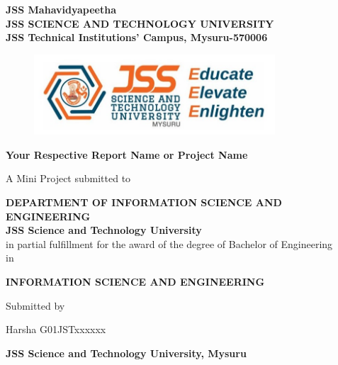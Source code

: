 \thispagestyle{empty} 
\begin{center}
    { \large {\bfseries {JSS Mahavidyapeetha \\
    JSS SCIENCE AND TECHNOLOGY UNIVERSITY \\
    JSS Technical Institutions’ Campus, Mysuru-570006} \par}}
    
    \vspace{2\baselineskip}
    {\begin{figure}[!h] 
	\centering
	\includegraphics[width=90mm]{images/jssstu_logo.jpg} 
     \end{figure}
    }

\vspace{2\baselineskip}
    {\Large \textbf{Your Respective Report Name or Project Name}\par}

\vspace{2\baselineskip}
    {\small{A Mini Project submitted to} \par}
\vspace{0.5\baselineskip}
    {\small\textbf{DEPARTMENT OF INFORMATION SCIENCE AND ENGINEERING \\ JSS Science and Technology University}\\
    \vspace{1\baselineskip}
    \small{in partial fulfillment for the award of the degree of Bachelor of Engineering\\in}}\par
\vspace{0.5\baselineskip}
    {\large \bf {INFORMATION SCIENCE AND ENGINEERING} \par} 

\vspace{2\baselineskip}
    {{Submitted by} \par}

\vspace{\baselineskip}
    {{\large { Harsha G\quad 01JSTxxxxxx}} }

\vspace{3\baselineskip}
    {\bf\small \MakeUppercase{\mydep} \par}
    {\bf {JSS Science and Technology University, Mysuru} \par \myyear}

 \end{center}

